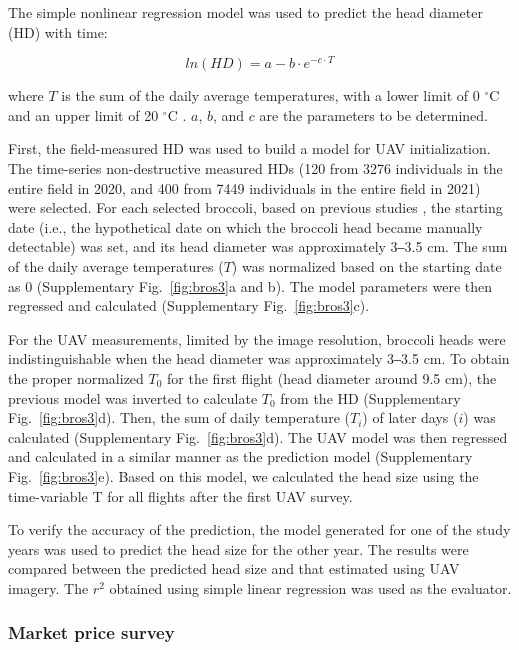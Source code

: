 The simple nonlinear regression model \citep{grevsen_effects_1997} was used to predict the head diameter (HD) with time:

$$ln(HD) = a - b \cdot e ^ {- c \cdot T}$$

\noindent
where $T$ is the sum of the daily average temperatures, with a lower limit of 0 $^\circ$C and an upper limit of 20 $^\circ$C \citep{tan_predicting_2000,cammarano_predicting_2020}. $a$, $b$, and $c$ are the parameters to be determined.

First, the field-measured HD was used to build a model for UAV initialization. The time-series non-destructive measured HDs (120 from 3276 individuals in the entire field in 2020, and 400 from 7449 individuals in the entire field in 2021) were selected. For each selected broccoli, based on previous studies \citep{cammarano_predicting_2020}, the starting date (i.e., the hypothetical date on which the broccoli head became manually detectable) was set, and its head diameter was approximately 3‒3.5 cm. The sum of the daily average temperatures ($T$) was normalized based on the starting date as 0 (Supplementary Fig.~\ref{fig:bros3}a and b). The model parameters were then regressed and calculated (Supplementary Fig.~\ref{fig:bros3}c). 

For the UAV measurements, limited by the image resolution, broccoli heads were indistinguishable when the head diameter was approximately 3‒3.5 cm. To obtain the proper normalized $T_0$ for the first flight (head diameter around 9.5 cm), the previous model was inverted to calculate $T_0$ from the HD (Supplementary Fig.~\ref{fig:bros3}d). Then, the sum of daily temperature ($T_i$) of later days ($i$) was calculated (Supplementary Fig.~\ref{fig:bros3}d). The UAV model was then regressed and calculated in a similar manner as the prediction model (Supplementary Fig.~\ref{fig:bros3}e). Based on this model, we calculated the head size using the time-variable T for all flights after the first UAV survey.

To verify the accuracy of the prediction, the model generated for one of the study years was used to predict the head size for the other year. The results were compared between the predicted head size and that estimated using UAV imagery. The $r^2$ obtained using simple linear regression was used as the evaluator.

\subsubsection*{Market price survey}

